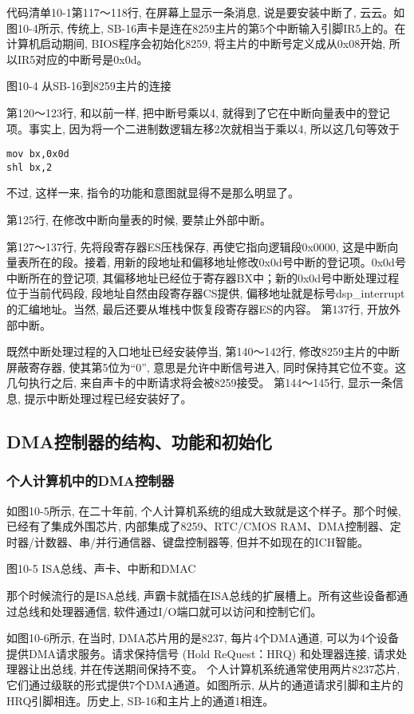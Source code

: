 \documentclass[12pt]{article}
\begin{document}
\begin{CJK}{UTF8}{gbsn}
代码清单10-1第117～118行, 在屏幕上显示一条消息, 说是要安装中断了, 云云。如图10-4所示, 传统上, SB-16声卡是连在8259主片的第5个中断输入引脚IR5上的。在计算机启动期间, BIOS程序会初始化8259, 将主片的中断号定义成从0x08开始, 所以IR5对应的中断号是0x0d。
 
图10-4  从SB-16到8259主片的连接

第120～123行, 和以前一样, 把中断号乘以4, 就得到了它在中断向量表中的登记项。事实上, 因为将一个二进制数逻辑左移2次就相当于乘以4, 所以这几句等效于

\begin{verbatim}
mov bx,0x0d
shl bx,2
\end{verbatim}

不过, 这样一来, 指令的功能和意图就显得不是那么明显了。

第125行, 在修改中断向量表的时候, 要禁止外部中断。

第127～137行, 先将段寄存器ES压栈保存, 再使它指向逻辑段0x0000, 这是中断向量表所在的段。接着, 用新的段地址和偏移地址修改0x0d号中断的登记项。0x0d号中断所在的登记项, 其偏移地址已经位于寄存器BX中；新的0x0d号中断处理过程位于当前代码段, 段地址自然由段寄存器CS提供, 偏移地址就是标号dsp\_{}interrupt的汇编地址。当然, 最后还要从堆栈中恢复段寄存器ES的内容。
第137行, 开放外部中断。

既然中断处理过程的入口地址已经安装停当, 第140～142行, 修改8259主片的中断屏蔽寄存器, 使其第5位为“0”, 意思是允许中断信号进入, 同时保持其它位不变。这几句执行之后, 来自声卡的中断请求将会被8259接受。
第144～145行, 显示一条信息, 提示中断处理过程已经安装好了。

\subsection{DMA控制器的结构、功能和初始化}
\subsubsection{个人计算机中的DMA控制器}
如图10-5所示, 在二十年前, 个人计算机系统的组成大致就是这个样子。那个时候, 已经有了集成外围芯片, 内部集成了8259、RTC/CMOS RAM、DMA控制器、定时器/计数器、串/并行通信器、键盘控制器等, 但并不如现在的ICH智能。
 
图10-5  ISA总线、声卡、中断和DMAC

那个时候流行的是ISA总线, 声霸卡就插在ISA总线的扩展槽上。所有这些设备都通过总线和处理器通信, 软件通过I/O端口就可以访问和控制它们。

如图10-6所示, 在当时, DMA芯片用的是8237, 每片4个DMA通道, 可以为4个设备提供DMA请求服务。请求保持信号 (Hold ReQuest：HRQ) 和处理器连接, 请求处理器让出总线, 并在传送期间保持不变。
个人计算机系统通常使用两片8237芯片, 它们通过级联的形式提供7个DMA通道。如图所示, 从片的通道请求引脚和主片的HRQ引脚相连。历史上, SB-16和主片上的通道1相连。
 

\end{CJK}
\end{document}
